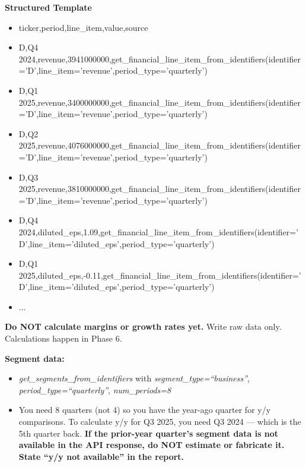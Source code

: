 \documentclass[11pt]{article}
\begin{document}
\textbf{Structured Template}
\begin{itemize}[leftmargin=*,itemsep=2pt,topsep=2pt]
\item {} ticker,period,line\_\allowbreak{}item,value,source
\item {} D,Q4 2024,revenue,3941000000,get\_\allowbreak{}financial\_\allowbreak{}line\_\allowbreak{}item\_\allowbreak{}from\_\allowbreak{}identifiers(identifier='D',line\_\allowbreak{}item='revenue',period\_\allowbreak{}type='quarterly')
\item {} D,Q1 2025,revenue,3400000000,get\_\allowbreak{}financial\_\allowbreak{}line\_\allowbreak{}item\_\allowbreak{}from\_\allowbreak{}identifiers(identifier='D',line\_\allowbreak{}item='revenue',period\_\allowbreak{}type='quarterly')
\item {} D,Q2 2025,revenue,4076000000,get\_\allowbreak{}financial\_\allowbreak{}line\_\allowbreak{}item\_\allowbreak{}from\_\allowbreak{}identifiers(identifier='D',line\_\allowbreak{}item='revenue',period\_\allowbreak{}type='quarterly')
\item {} D,Q3 2025,revenue,3810000000,get\_\allowbreak{}financial\_\allowbreak{}line\_\allowbreak{}item\_\allowbreak{}from\_\allowbreak{}identifiers(identifier='D',line\_\allowbreak{}item='revenue',period\_\allowbreak{}type='quarterly')
\item {} D,Q4 2024,diluted\_\allowbreak{}eps,1.09,get\_\allowbreak{}financial\_\allowbreak{}line\_\allowbreak{}item\_\allowbreak{}from\_\allowbreak{}identifiers(identifier='D',line\_\allowbreak{}item='diluted\_\allowbreak{}eps',period\_\allowbreak{}type='quarterly')
\item {} D,Q1 2025,diluted\_\allowbreak{}eps,-0.11,get\_\allowbreak{}financial\_\allowbreak{}line\_\allowbreak{}item\_\allowbreak{}from\_\allowbreak{}identifiers(identifier='D',line\_\allowbreak{}item='diluted\_\allowbreak{}eps',period\_\allowbreak{}type='quarterly')
\item {} ...
\end{itemize}

\textbf{Do NOT calculate margins or growth rates yet.} Write raw data only. Calculations happen in Phase 6.


\textbf{Segment data:}

\begin{itemize}[leftmargin=*,itemsep=2pt,topsep=2pt]
\item {} \emph{get\_\allowbreak{}segments\_\allowbreak{}from\_\allowbreak{}identifiers} with \emph{segment\_\allowbreak{}type=``business''}, \emph{period\_\allowbreak{}type=``quarterly''}, \emph{num\_\allowbreak{}periods=8}
\item {} You need 8 quarters (not 4) so you have the year-ago quarter for y/y comparisons. To calculate y/y for Q3 2025, you need Q3 2024 — which is the 5th quarter back. \textbf{If the prior-year quarter's segment data is not available in the API response, do NOT estimate or fabricate it. State ``y/y not available'' in the report.}
\end{itemize}
\end{document}
